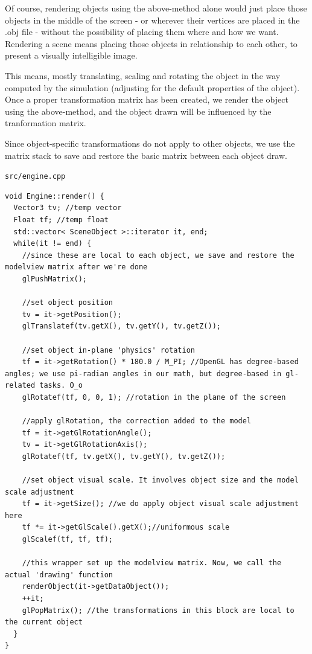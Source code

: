 \documentclass{scrartcl}
\begin{document}
Of course, rendering objects using the above-method alone would just place those objects in the middle of the screen - or wherever their vertices are placed in the .obj file - without the possibility of placing them where and how we want. Rendering a scene means placing those objects in relationship to each other, to present a visually intelligible image.

This means, mostly translating, scaling and rotating the object in the way computed by the simulation (adjusting for the default properties of the object).
Once a proper transformation matrix has been created, we render the object using the above-method, and the object drawn will be influenced by the tranformation matrix.

Since object-specific transformations do not apply to other objects, we use the matrix stack to save and restore the basic matrix between each object draw.

\lstinline{src/engine.cpp}
\begin{lstlisting}
void Engine::render() {
  Vector3 tv; //temp vector
  Float tf; //temp float
  std::vector< SceneObject >::iterator it, end;
  while(it != end) {
    //since these are local to each object, we save and restore the modelview matrix after we're done
    glPushMatrix();

    //set object position
    tv = it->getPosition();
    glTranslatef(tv.getX(), tv.getY(), tv.getZ());

    //set object in-plane 'physics' rotation
    tf = it->getRotation() * 180.0 / M_PI; //OpenGL has degree-based angles; we use pi-radian angles in our math, but degree-based in gl-related tasks. O_o
    glRotatef(tf, 0, 0, 1); //rotation in the plane of the screen

    //apply glRotation, the correction added to the model
    tf = it->getGlRotationAngle();
    tv = it->getGlRotationAxis();
    glRotatef(tf, tv.getX(), tv.getY(), tv.getZ()); 

    //set object visual scale. It involves object size and the model scale adjustment
    tf = it->getSize(); //we do apply object visual scale adjustment here
    tf *= it->getGlScale().getX();//uniformous scale
    glScalef(tf, tf, tf);

    //this wrapper set up the modelview matrix. Now, we call the actual 'drawing' function
    renderObject(it->getDataObject());
    ++it;
    glPopMatrix(); //the transformations in this block are local to the current object
  }
}
\end{lstlisting}
\end{document}
